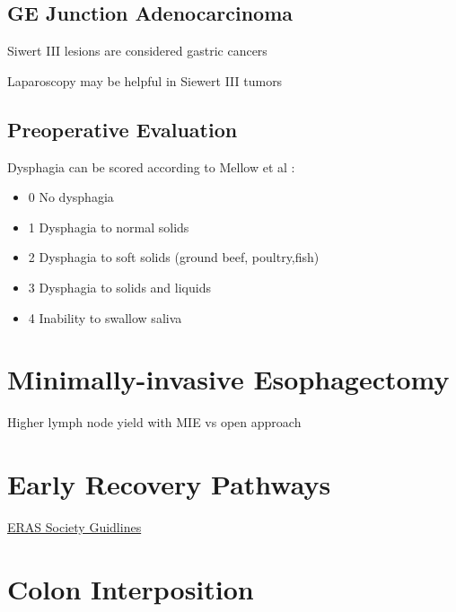 \documentclass[
]{book}
\providecommand{\tightlist}{%
  \setlength{\itemsep}{0pt}\setlength{\parskip}{0pt}}
\begin{document}
\hypertarget{ge-junction-adenocarcinoma}{%
\subsection{GE Junction Adenocarcinoma}\label{ge-junction-adenocarcinoma}}

Siwert III lesions are considered gastric cancers \citep{rusch444} \citep{siewert260}

Laparoscopy may be helpful in Siewert III tumors \citep{degraaf988}

\hypertarget{preoperative-evaluation}{%
\subsection{Preoperative Evaluation}\label{preoperative-evaluation}}

Dysphagia can be scored according to Mellow et al \citep{mellow1443}:

\begin{itemize}
\tightlist
\item
  0 No dysphagia
\item
  1 Dysphagia to normal solids
\item
  2 Dysphagia to soft solids (ground beef, poultry,fish)
\item
  3 Dysphagia to solids and liquids
\item
  4 Inability to swallow saliva
\end{itemize}

\hypertarget{minimally-invasive-esophagectomy}{%
\section{Minimally-invasive Esophagectomy}\label{minimally-invasive-esophagectomy}}

Higher lymph node yield with MIE vs open approach \citep{kalffa}

\hypertarget{early-recovery-pathways}{%
\section{Early Recovery Pathways}\label{early-recovery-pathways}}

\href{https://www.ncbi.nlm.nih.gov/pmc/articles/PMC7098920/}{ERAS Society Guidlines}

\hypertarget{colon-interposition}{%
\section{Colon Interposition}\label{colon-interposition}}
\end{document}
